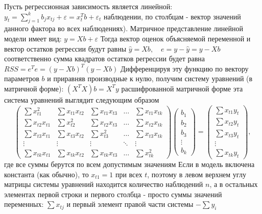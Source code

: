\documentclass[a4paper, 12pt]{article}
\begin{document}
Пусть регрессионная зависимость является линейной:
$y_{t}=\sum_{j=1}^{k} b_{j} x_{t j}+\varepsilon=x_{t}^{T} b+\varepsilon_{t}$
наблюдении, по столбцам - вектор значений данного фактора во всех наблюдениях). Матричное представление линейной модели имеет вид:
$y=X b+\varepsilon$
Тогда вектор оценок объясняемой переменной и вектор остатков регрессии будут равны
$\hat{y}=X b, \quad e=y-\hat{y}=y-X b$
соответственно сумма квадратов остатков регрессии будет равна $R S S=e^{T} e=(y-X b)^{T}(y-X b)$
Дифференцируя эту функцию по вектору параметров $b$ и приравняв производные к нулю, получим систему уравнений (в матричной форме):
$\left(X^{T} X\right) b=X^{T} y$
расшифрованной матричной форме эта система уравнений выглядит следующим образом 
\begin{equation*}
	\left(\begin{array}{ccccc}\sum x_{t 1}^{2} & \sum x_{t 1} x_{t 2} & \sum x_{t 1} x_{t 3} & \ldots & \sum x_{t 1} x_{t k} \\ \sum x_{t 2} x_{t 1} & \sum x_{t 2}^{2} & \sum x_{t 2} x_{t 3} & \ldots & \sum x_{t 2} x_{t k} \\ \sum x_{t 3} x_{t 1} & \sum x_{t 3} x_{t 2} & \sum x_{t 3}^{2} & \ldots & \sum x_{t 3} x_{t k} \\ \vdots & \vdots & \vdots & \ddots & \vdots \\ \sum x_{t k} x_{t 1} & \sum x_{t k} x_{t 2} & \sum x_{t k} x_{t 3} & \ldots & \sum x_{t k}^{2}\end{array}\right)\left(\begin{array}{c}b_{1} \\ b_{2} \\ b_{3} \\ \vdots \\ b_{k}\end{array}\right)=\left(\begin{array}{c}\sum x_{t 1} y_{t} \\ \sum x_{t 2} y_{t} \\ \sum x_{t 3} y_{t} \\ \vdots \\ \sum x_{t k} y_{t}\end{array}\right),
	\end{equation*}
	 где все суммы берутся по всем допустимым значениям
Если в модель включена константа (как обычно), то $x_{t 1}=1$ при всех $t$, поэтому в левом верхнем углу матрицы системы уравнений находится количество наблюдений $n$, а в остальных элементах первой строки и первого столбца - просто суммы значений переменных: $\sum x_{t j}$ и первый элемент правой части системы $-\sum y_{i}$
\end{document}
